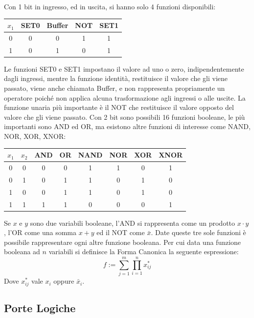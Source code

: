 \documentclass{article}
\numberwithin{equation}{subsection}
\begin{document}
Con 1 bit in ingresso, ed in uscita, si hanno solo 4 funzioni disponibili: 
\begin{center}
    \begin{tabular}{|c||c|c|c|c|}
        \hline
        $x_1$&SET0&Buffer&NOT&SET1\\
        \hline\hline
        0&0&0&1&1\\
        \hline
        1&0&1&0&1\\
        \hline
    \end{tabular}
\end{center}
Le funzioni SET0 e SET1 impostano il valore ad uno o zero, indipendentemente dagli ingressi, mentre la funzione identità, restituisce il valore che gli viene passato, viene anche chiamata Buffer, e non 
rappresenta propriamente un operatore poiché non applica alcuna trasformazione agli ingressi o alle uscite. La funzione unaria più importante è il 
NOT che restituisce il valore opposto del valore che gli viene passato. 
Con 2 bit sono possibili 16 funzioni booleane, le più importanti sono AND ed OR, ma esistono altre funzioni di interesse come NAND, NOR, XOR, XNOR:
\begin{center}
    \begin{tabular}{|c|c||c|c|c|c|c|c|}
        \hline
        $x_1$&$x_2$&AND&OR&NAND&NOR&XOR&XNOR\\
        \hline\hline
        0&0&0&0&1&1&0&1\\
        \hline
        0&1&0&1&1&0&1&0\\
        \hline
        1&0&0&1&1&0&1&0\\
        \hline
        1&1&1&1&0&0&0&1\\
        \hline
    \end{tabular}
\end{center}

Se $x$ e $y$ sono due variabili booleane, l'AND si rappresenta come un prodotto $x\cdot y$, l'OR come una somma $x+y$ ed il NOT come $\bar{x}$. Date queste tre sole funzioni è possibile rappresentare ogni altre 
funzione booleana. Per cui data una funzione booleana ad $n$ variabili si definisce la Forma Canonica la seguente espressione:
\begin{equation}
    f:=\sum_{j=1}^m\prod_{i=1}^nx_{ij}^*
\end{equation}
Dove $x_{ij}^*$ vale $x_i$ oppure $\bar{x}_i$. 

\subsection{Porte Logiche}
\end{document}
